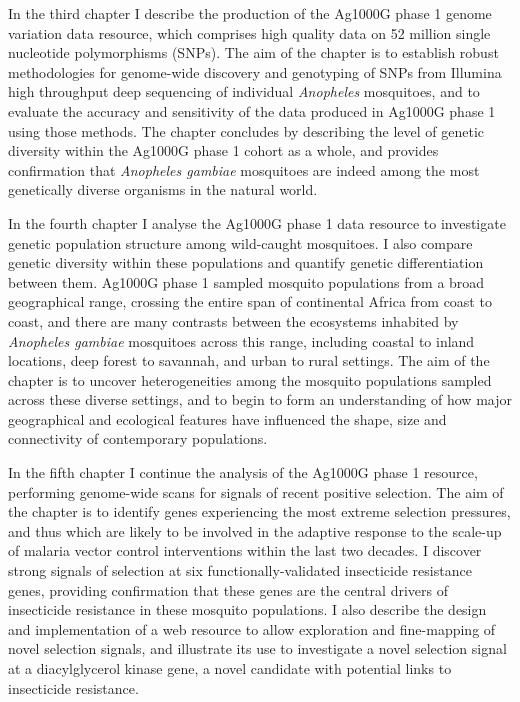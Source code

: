 \begin{refsection}
In the third chapter I describe the production of the Ag1000G phase 1 genome variation data resource, which comprises high quality data on 52 million single nucleotide polymorphisms (SNPs).
%
The aim of the chapter is to establish robust methodologies for genome-wide discovery and genotyping of SNPs from Illumina high throughput deep sequencing of individual \textit{Anopheles} mosquitoes, and to evaluate the accuracy and sensitivity of the data produced in Ag1000G phase 1 using those methods.
%
The chapter concludes by describing the level of genetic diversity within the Ag1000G phase 1 cohort as a whole, and provides confirmation that \textit{Anopheles gambiae} mosquitoes are indeed among the most genetically diverse organisms in the natural world.


In the fourth chapter I analyse the Ag1000G phase 1 data resource to investigate genetic population structure among wild-caught mosquitoes.
%
I also compare genetic diversity within these populations and quantify genetic differentiation between them.
%
Ag1000G phase 1 sampled mosquito populations from a broad geographical range, crossing the entire span of continental Africa from coast to coast, and there are many contrasts between the ecosystems inhabited by \textit{Anopheles gambiae} mosquitoes across this range, including coastal to inland locations, deep forest to savannah, and urban to rural settings.
%
The aim of the chapter is to uncover heterogeneities among the mosquito populations sampled across these diverse settings, and to begin to form an understanding of how major geographical and ecological features have influenced the shape, size and connectivity of contemporary populations.


In the fifth chapter I continue the analysis of the Ag1000G phase 1 resource, performing genome-wide scans for signals of recent positive selection.
%
The aim of the chapter is to identify genes experiencing the most extreme selection pressures, and thus which are likely to be involved in the adaptive response to the scale-up of malaria vector control interventions within the last two decades.
%
I discover strong signals of selection at six functionally-validated insecticide resistance genes, providing confirmation that these genes are the central drivers of insecticide resistance in these mosquito populations.
%
I also describe the design and implementation of a web resource to allow exploration and fine-mapping of novel selection signals, and illustrate its use to investigate a novel selection signal at a diacylglycerol kinase gene, a novel candidate with potential links to insecticide resistance.



\end{refsection}
